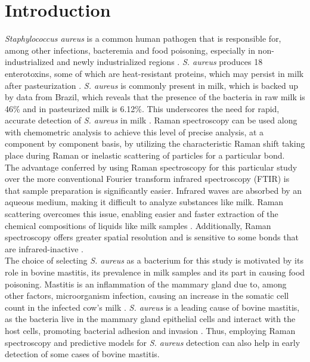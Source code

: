 
\section{Introduction}
\textit{Staphylococcus aureus} is a common human pathogen that is responsible for, among other infections, bacteremia and food poisoning, especially in non-industrialized and newly industrialized regions \cite{Tong2015}. \textit{S. aureus} produces 18 enterotoxins, some of which are heat-resistant proteins, which may persist in milk after pasteurization \cite{SciDir_SD_StaphEnterotoxin, Jin2016}. \textit{S. aureus} is commonly present in milk, which is backed up by data from Brazil, which reveals that the presence of the bacteria in raw milk is 46\% and in pasteurized milk is 6.12\%. This underscores the need for rapid, accurate detection of \textit{S. aureus} in milk \cite{Zhang2023}. Raman spectroscopy can be used along with chemometric analysis to achieve this level of precise analysis, at a component by component basis, by utilizing the characteristic Raman shift taking place during Raman or inelastic scattering of particles for a particular bond.\\

\noindent The advantage conferred by using Raman spectroscopy for this particular study over the more conventional Fourier transform infrared spectroscopy (FTIR) is that sample preparation is significantly easier. Infrared waves are absorbed by an aqueous medium, making it difficult to analyze substances like milk. Raman scattering overcomes this issue, enabling easier and faster extraction of the chemical compositions of liquids like milk samples \cite{AzoOptics_1291}. Additionally, Raman spectroscopy offers greater spatial resolution and is sensitive to some bonds that are infrared-inactive \cite{Walzak_FTIR_Raman}. \\

\noindent The choice of selecting \textit{S. aureus} as a bacterium for this study is motivated by its role in bovine mastitis, its prevalence in milk samples and its part in causing food poisoning. Mastitis is an inflammation of the mammary gland due to, among other factors, microorganism infection, causing an increase in the somatic cell count in the infected cow’s milk \cite{Buczacki2020}. \textit{S. aureus} is a leading cause of bovine mastitis, as the bacteria live in the mammary gland epithelial cells and interact with the host cells, promoting bacterial adhesion and invasion \cite{Pavlova2022}. Thus, employing Raman spectroscopy and predictive models for \textit{S. aureus} detection can also help in early detection of some cases of bovine mastitis. \\


